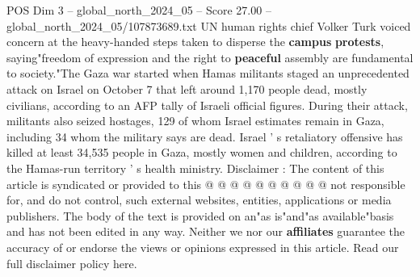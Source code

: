 \begin{textsample}{POS Dim 3 – global\_north\_2024\_05 – Score 27.00 – global\_north\_2024\_05/107873689.txt}
UN human rights chief Volker Turk voiced concern at the heavy-handed steps taken to disperse the \textbf{campus} \textbf{protests}, saying"freedom of expression and the right to \textbf{peaceful} assembly are fundamental to society."The Gaza war started when Hamas militants staged an unprecedented attack on Israel on October 7 that left around 1,170 people dead, mostly civilians, according to an AFP tally of Israeli official figures.
During their attack, militants also seized hostages, 129 of whom Israel estimates remain in Gaza, including 34 whom the military says are dead.
Israel ' s retaliatory offensive has killed at least 34,535 people in Gaza, mostly women and children, according to the Hamas-run territory ' s health ministry.
Disclaimer : The content of this article is syndicated or provided to this @ @ @ @ @ @ @ @ @ @ not responsible for, and do not control, such external websites, entities, applications or media publishers.
The body of the text is provided on an"as is"and"as available"basis and has not been edited in any way.
Neither we nor our \textbf{affiliates} guarantee the accuracy of or endorse the views or opinions expressed in this article.
Read our full disclaimer policy here.

\end{textsample}
